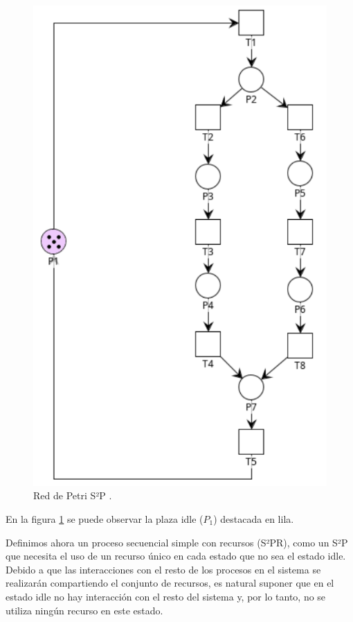 \begin{figure} [H]
    \centering
    \includegraphics[scale=0.4]{Figures/marco teorico/s2p_chica.png}
    \caption[Red de Petri S²P.]{Red de Petri S²P \footnotemark.}
    \label{fig:rdp_s2p}
\end{figure}  

\noindent En la figura \ref{fig:rdp_s2p} se puede observar la plaza idle ($P_1$) destacada en lila. \\

\par Definimos ahora un proceso secuencial simple con recursos (S²PR), como un S²P que necesita el uso de un recurso único en cada estado que no sea el estado idle. Debido a que las interacciones con el resto de los procesos en el sistema se realizarán compartiendo el conjunto de recursos, es natural suponer que en el estado idle no hay interacción con el resto del sistema y, por lo tanto, no se utiliza ningún recurso en este estado.

